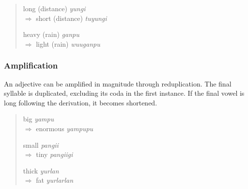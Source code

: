 \begin{quote}
\begin{multicols}{2}
long (distance) \textit{yungi}\\
$\Rightarrow$ short (distance) \textit{tuyungi}

heavy (rain) \textit{ganpu}\\
$\Rightarrow$ light (rain) \textit{wuuganpu}
\end{multicols}
\end{quote}

\subsubsection{Amplification}

An adjective can be amplified in magnitude through reduplication. The final
syllable is duplicated, excluding its coda in the first instance. If the final
vowel is long following the derivation, it becomes shortened.

\begin{quote}
\begin{multicols}{3}
big \textit{yampu}\\
$\Rightarrow$ enormous \textit{yampupu}

small \textit{pangii}\\
$\Rightarrow$ tiny \textit{pangiigi}

thick \textit{yurlan}\\
$\Rightarrow$ fat \textit{yurlarlan}
\end{multicols}
\end{quote}